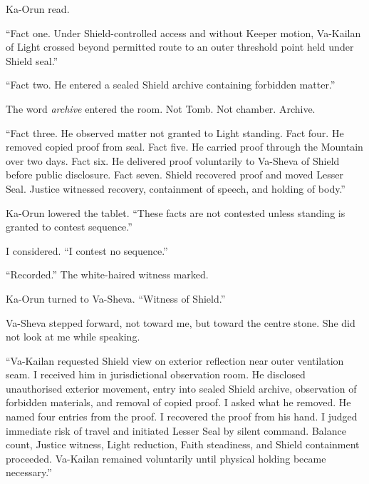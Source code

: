 Ka-Orun read.\par

``Fact one. Under Shield-controlled access and without Keeper motion, Va-Kailan of Light crossed beyond permitted route to an outer threshold point held under Shield seal.''\par

``Fact two. He entered a sealed Shield archive containing forbidden matter.''\par

The word \emph{archive} entered the room. Not Tomb. Not chamber. Archive.\par

``Fact three. He observed matter not granted to Light standing. Fact four. He removed copied proof from seal. Fact five. He carried proof through the Mountain over two days. Fact six. He delivered proof voluntarily to Va-Sheva of Shield before public disclosure. Fact seven. Shield recovered proof and moved Lesser Seal. Justice witnessed recovery, containment of speech, and holding of body.''\par

Ka-Orun lowered the tablet. ``These facts are not contested unless standing is granted to contest sequence.''\par

I considered. ``I contest no sequence.''\par

``Recorded.'' The white-haired witness marked.\par

Ka-Orun turned to Va-Sheva. ``Witness of Shield.''\par

Va-Sheva stepped forward, not toward me, but toward the centre stone. She did not look at me while speaking.\par

``Va-Kailan requested Shield view on exterior reflection near outer ventilation seam. I received him in jurisdictional observation room. He disclosed unauthorised exterior movement, entry into sealed Shield archive, observation of forbidden materials, and removal of copied proof. I asked what he removed. He named four entries from the proof. I recovered the proof from his hand. I judged immediate risk of travel and initiated Lesser Seal by silent command. Balance count, Justice witness, Light reduction, Faith steadiness, and Shield containment proceeded. Va-Kailan remained voluntarily until physical holding became necessary.''\par

